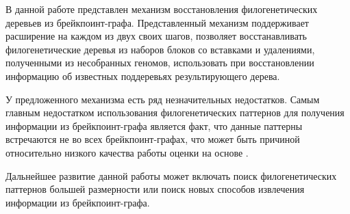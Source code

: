 \conclusion

В данной работе представлен механизм восстановления филогенетических деревьев из брейкпоинт-графа.
Представленный механизм поддерживает расширение на каждом из двух своих шагов,
позволяет восстанавливать филогенетические деревья из наборов блоков со вставками и удалениями,
полученными из несобранных геномов, использовать при восстановлении информацию об известных поддеревьях результирующего дерева.

У предложенного механизма есть ряд незначительных недостатков.
Самым главным недостатком использования филогенетических паттернов для получения информации из брейкпоинт-графа является факт,
что данные паттерны встречаются не во всех брейкпоинт-графах, что может быть причиной относительно низкого качества работы
оценки на основе .

Дальнейшее развитие данной работы может включать поиск филогенетических паттернов большей размерности или поиск новых способов
извлечения информации из брейкпоинт-графа.
